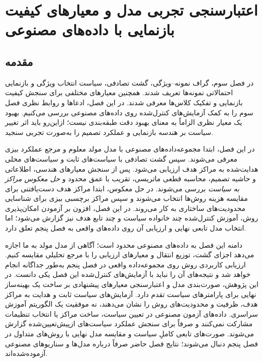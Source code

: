 \chapter{اعتبارسنجی تجربی مدل و معیارهای کیفیت بازنمایی با داده‌های مصنوعی}
\label{chap:results}
\label{chap:policy-training}

\section{مقدمه}
در فصل سوم، گراف نمونه--ویژگی، گشت تصادفی، سیاست انتخاب ویژگی و بازنمایی احتمالاتی نمونه‌ها تعریف شدند. همچنین معیارهای مختلفی برای سنجش کیفیت بازنمایی و تفکیک کلاس‌ها معرفی شدند. در این فصل، ‌ادعاها و روابط نظری فصل سوم را به کمک آزمایش‌های کنترل‌شده روی ‌داده‌های مصنوعی بررسی می‌کنیم. بهبود یک معیار نظری الزاماً به معنای بهبود دقت طبقه‌بندی نیست؛ ازاین‌رو باید اثر تغییر سیاست بر هندسه بازنمایی و عملکرد تصمیم را به‌صورت تجربی سنجید.

در این فصل، ابتدا مجموعه‌داده‌های مصنوعی با مدل مولد معلوم و مرجع عملکرد بیزی معرفی می‌شوند. سپس گشت تصادفی با سیاست‌های ثابت و سیاست‌های محلی هدایت‌شده به مراکز هدف ارزیابی می‌شود. پس از سنجش معیارهای هندسی، اطلاعاتی و حاشیه تصمیم، محاسبه قطعی ماتریسی، تقریب با عمق محدود و \emph{حل معکوس مراکز به سیاست} بررسی می‌شوند. در حل معکوس، ابتدا مراکز هدف دست‌یافتنی برای مقایسه هزینه روش‌ها انتخاب می‌شوند و سپس مراکز برچسبی بیزی برای شناسایی محدودیت‌های ساختاری به کار می‌روند. در این فصل، افزون بر آزمودن امکان‌پذیری روش، آموزش کنترل‌شده چند خانواده سیاست و چند تابع هدف نیز گزارش می‌شود؛ اما انتخاب مدل تابعی نهایی و ارزیابی آن روی داده‌های واقعی به فصل پنجم تعلق دارد.

دامنه این فصل به ‌داده‌های مصنوعی محدود است؛ آگاهی از مدل مولد به ما اجازه می‌دهد اجزای گشت، توزیع انتقال و معیارهای ارزیابی را با مرجع تحلیلی مقایسه کنیم. ارزیابی کاربردی روش روی مجموعه‌داده واقعی در فصل پنجم به‌طور جداگانه انجام خواهد شد و نتیجه‌های آن را نباید با آزمایش‌های کنترل‌شده این فصل یکی دانست. در این پژوهش، صورت‌بندی مدل و اعتبارسنجی معیارهای پیشنهادی بر ساخت یک بهینه‌ساز نهایی برای پارامترهای سیاست تقدم دارد. آزمایش‌های سیاست ثابت و هدایت به مراکز هدف، ظرفیت و محدودیت‌های روش را نشان می‌دهند، نه موفقیت یک الگوریتم آموزش سراسری. داده‌های آزمون مصنوعی در تعیین سیاست، ساخت مراکز یا انتخاب تنظیمات مشارکت نمی‌کنند و صرفاً برای سنجش عملکرد سیاست‌های ازپیش‌تعیین‌شده گزارش می‌شوند. صورت‌های تابعی کاملِ سیاست و مقایسه مدل نهایی با روش‌های متداول در فصل پنجم دنبال می‌شوند؛ نتایج فصل حاضر صرفاً درباره مدل‌ها و سناریوهای مصنوعی آزموده‌شده‌اند.


